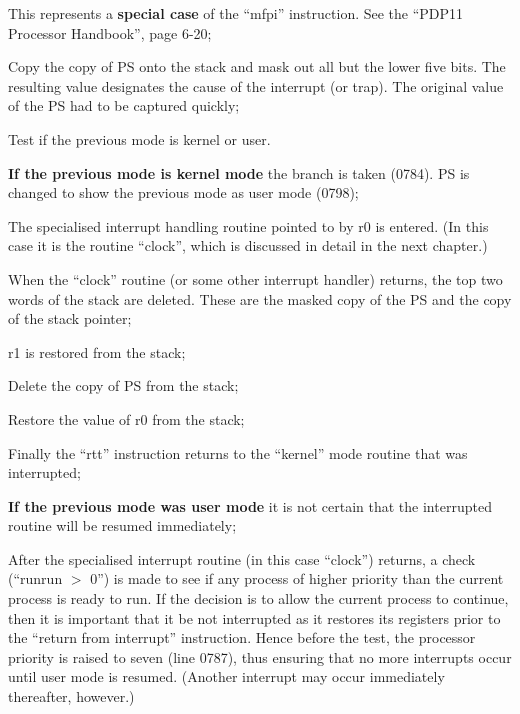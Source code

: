 This represents a {\bf special case} of
the ``mfpi'' instruction. See the
``PDP11 Processor Handbook'', page
6-20;

\item[781:] Copy the copy of PS onto the
 stack and mask out all but the
 lower five bits. The resulting
 value designates the cause of the
 interrupt (or trap). The original value of the PS had to be
 captured quickly;

\item[0783:] Test if the previous mode is kernel or user.

{\bf If the previous mode is kernel
mode} the branch is taken (0784).
PS is changed to show the previous
mode as user mode (0798);

\item[0799:] The specialised interrupt handling routine pointed to by r0 is
entered. (In this case it is the
routine ``clock'', which is discussed in detail in the next
chapter.)

\item[0800:] When the ``clock'' routine (or some
other interrupt handler) returns,
the top two words of the stack
are deleted. These are the
masked copy of the PS and the
copy of the stack pointer;

\item[0802:] r1 is restored from the stack;

\item[0803:] Delete the copy of PS from the
 stack;

\item[0804:] Restore the value of r0 from the
 stack;

\item[0805:] Finally the ``rtt'' instruction
returns to the ``kernel'' mode
routine that was interrupted;

{\bf If the previous mode was user mode}
it is not certain that the interrupted routine will be resumed
immediately;

\item[0788:] After the specialised interrupt
routine (in this case ``clock'')
returns, a check (``runrun $>$ 0'')
is made to see if any process of
higher priority than the current
process is ready to run. If the
decision is to allow the current
process to continue, then it is
important that it be not interrupted as
it restores its registers prior to the ``return from
interrupt'' instruction. Hence
before the test, the processor
priority is raised to seven (line
0787), thus ensuring that no more
interrupts occur until user mode
is resumed. (Another interrupt
may occur immediately thereafter,
however.)
\ed


